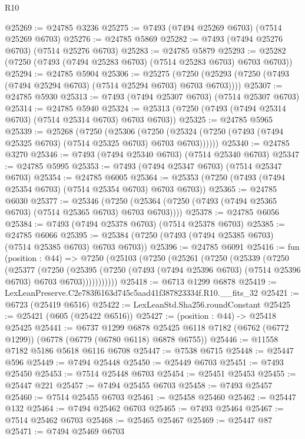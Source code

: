 \begin{lexlean}{R10}
\begin{coremodule}
@25269 := @24785 @3236
@25275 := @7493 (@7494 @25269 @6703) (@7514 @25269 @6703)
@25276 := @24785 @5869
@25282 := @7493 (@7494 @25276 @6703) (@7514 @25276 @6703)
@25283 := @24785 @5879
@25293 := @25282 (@7250 (@7493 (@7494 @25283 @6703) (@7514 @25283 @6703) @6703 @6703))
@25294 := @24785 @5904
@25306 := @25275
    (@7250 (@25293 (@7250 (@7493 (@7494 @25294 @6703) (@7514 @25294 @6703) @6703 @6703))))
@25307 := @24785 @5930
@25313 := @7493 (@7494 @25307 @6703) (@7514 @25307 @6703)
@25314 := @24785 @5940
@25324 := @25313 (@7250 (@7493 (@7494 @25314 @6703) (@7514 @25314 @6703) @6703 @6703))
@25325 := @24785 @5965
@25339 := @25268
    (@7250
      (@25306
        (@7250 (@25324 (@7250 (@7493 (@7494 @25325 @6703) (@7514 @25325 @6703) @6703 @6703))))))
@25340 := @24785 @3270
@25346 := @7493 (@7494 @25340 @6703) (@7514 @25340 @6703)
@25347 := @24785 @5995
@25353 := @7493 (@7494 @25347 @6703) (@7514 @25347 @6703)
@25354 := @24785 @6005
@25364 := @25353 (@7250 (@7493 (@7494 @25354 @6703) (@7514 @25354 @6703) @6703 @6703))
@25365 := @24785 @6030
@25377 := @25346
    (@7250 (@25364 (@7250 (@7493 (@7494 @25365 @6703) (@7514 @25365 @6703) @6703 @6703))))
@25378 := @24785 @6056
@25384 := @7493 (@7494 @25378 @6703) (@7514 @25378 @6703)
@25385 := @24785 @6066
@25395 := @25384 (@7250 (@7493 (@7494 @25385 @6703) (@7514 @25385 @6703) @6703 @6703))
@25396 := @24785 @6091
@25416 := fun (position : @44) =>
  @7250
    (@25103
      (@7250
        (@25261
          (@7250
            (@25339
              (@7250
                (@25377
                  (@7250
                    (@25395
                      (@7250 (@7493 (@7494 @25396 @6703) (@7514 @25396 @6703) @6703 @6703)))))))))))
@25418 := @6713 @1299 @6878
@25419 := LexLeanPreserve.C2e783f6163d745c5aad41f387823334f.R10.__fits_32
@25421 := @6723 (@25419 @6516)
@25422 := LexLeanStd.Sha256.roundConstant
@25425 := @25421 (@605 (@25422 @6516))
@25427 := (position : @44) -> @25418 @25425
@25441 := @6737
    @1299
    @6878
    @25425
    @6118
    @7182
    (@6762 (@6772 @1299))
    (@6778 (@6779 (@6780 @6118) @6878 @6755))
@25446 := @11558 @7182 @5186 @5618 @6116 @6708
@25447 := @7538 @6715
@25448 := @25447 @596
@25449 := @7494 @25448
@25450 := @25449 @6703
@25451 := @7493 @25450
@25453 := @7514 @25448 @6703
@25454 := @25451 @25453
@25455 := @25447 @221
@25457 := @7494 @25455 @6703
@25458 := @7493 @25457
@25460 := @7514 @25455 @6703
@25461 := @25458 @25460
@25462 := @25447 @132
@25464 := @7494 @25462 @6703
@25465 := @7493 @25464
@25467 := @7514 @25462 @6703
@25468 := @25465 @25467
@25469 := @25447 @87
@25471 := @7494 @25469 @6703

\end{coremodule}
\end{lexlean}
